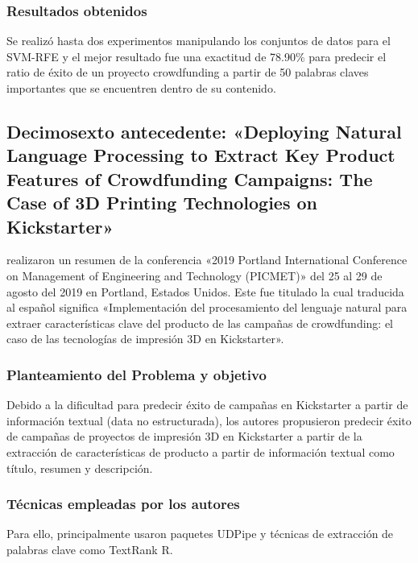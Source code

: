 \subsubsection{Resultados obtenidos}
Se realizó hasta dos experimentos manipulando los conjuntos de datos para el SVM-RFE y el mejor resultado fue una exactitud de 78.90\% para predecir el ratio de éxito de un proyecto crowdfunding a partir de 50 palabras claves importantes que se encuentren dentro de su contenido.

\subsection{Decimosexto antecedente: «Deploying Natural Language Processing to Extract Key Product Features of Crowdfunding Campaigns: The Case of 3D Printing Technologies on Kickstarter» \citep*{pr_chaichi2019nlp_3dprinting}}
\citeauthor{pr_chaichi2019nlp_3dprinting} realizaron un resumen de la conferencia «2019 Portland International Conference on Management of Engineering and Technology (PICMET)» del 25 al 29 de agosto del 2019 en Portland, Estados Unidos. Este fue titulado  la cual traducida al español significa «Implementación del procesamiento del lenguaje natural para extraer características clave del producto de las campañas de crowdfunding: el caso de las tecnologías de impresión 3D en Kickstarter».

\subsubsection{Planteamiento del Problema y objetivo}
Debido a la dificultad para predecir éxito de campañas en Kickstarter a partir de información textual (data no estructurada), los autores propusieron predecir éxito de campañas de proyectos de impresión 3D en Kickstarter a partir de la extracción de características de producto a partir de información textual como título, resumen y descripción.

\subsubsection{Técnicas empleadas por los autores}
Para ello, principalmente usaron paquetes UDPipe y técnicas de extracción de palabras clave como TextRank R.

